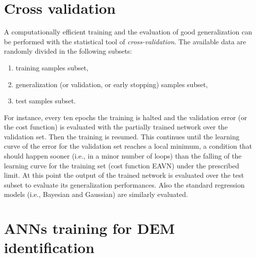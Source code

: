 
\section{Cross validation}
\label{sec:crossvalidation}

A computationally efficient training and the evaluation of good generalization
can be performed with the statistical tool of \textit{cross-validation}.
The available data are randomly divided in the following subsets:

\begin{enumerate}
  \item{training samples subset,}
  \item{generalization (or validation, or early stopping) samples subset,}
  \item{test samples subset.}
\end{enumerate}

For instance, every ten epochs the training is halted and the validation error
(or the cost function) is evaluated with the partially trained network over the
validation set.
Then the training is resumed.
This continues until the learning curve of the error for the validation set
reaches a local minimum, a condition that should happen sooner (i.e., in a
minor number of loops) than the falling of the learning curve for the training
set (cost function \acs{EAVN}) under the prescribed limit.
At this point the output of the trained network is evaluated over the test
subset to evaluate its generalization performances.
Also the standard regression models (i.e., Bayesian and Gaussian) are similarly
evaluated.

\section{ANNs training for DEM identification}
\label{sec:annstrainingfordemidentification}

